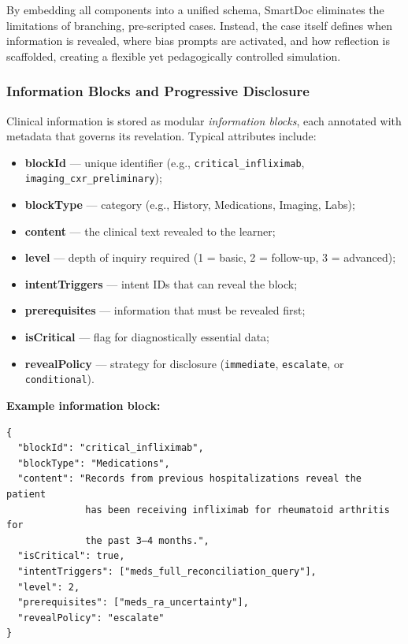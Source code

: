 By embedding all components into a unified schema, SmartDoc eliminates the limitations
of branching, pre-scripted cases.
Instead, the case itself defines when information is revealed, where bias prompts are
activated, and how reflection is scaffolded, creating a flexible yet pedagogically
controlled simulation.

\subsubsection{Information Blocks and Progressive Disclosure}

Clinical information is stored as modular \textit{information blocks}, each annotated
with metadata that governs its revelation.
Typical attributes include:

\begin{itemize}
  \item \textbf{blockId} — unique identifier (e.g.,
  \texttt{critical\_infliximab}, \texttt{imaging\_cxr\_preliminary});
  \item \textbf{blockType} — category (e.g., History, Medications, Imaging, Labs);
  \item \textbf{content} — the clinical text revealed to the learner;
  \item \textbf{level} — depth of inquiry required (1 = basic, 2 = follow-up, 3 = advanced);
  \item \textbf{intentTriggers} — intent IDs that can reveal the block;
  \item \textbf{prerequisites} — information that must be revealed first;
  \item \textbf{isCritical} — flag for diagnostically essential data;
  \item \textbf{revealPolicy} — strategy for disclosure (\texttt{immediate},
  \texttt{escalate}, or \texttt{conditional}).
\end{itemize}

\noindent
\textbf{Example information block:}

\begin{verbatim}
{
  "blockId": "critical_infliximab",
  "blockType": "Medications",
  "content": "Records from previous hospitalizations reveal the patient
              has been receiving infliximab for rheumatoid arthritis for
              the past 3–4 months.",
  "isCritical": true,
  "intentTriggers": ["meds_full_reconciliation_query"],
  "level": 2,
  "prerequisites": ["meds_ra_uncertainty"],
  "revealPolicy": "escalate"
}
\end{verbatim}

